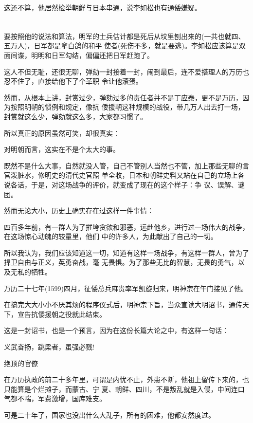 \documentclass[11pt,a4paper,onecolumn]{article}
\begin{document}
这还不算，他居然检举朝鲜与日本串通，说李如松也有通倭嫌疑。

\section[\thesection]{}

要按照他的说法和算法，明军的士兵估计都是死后从坟里刨出来的(一共也就四、五万人)，日军都是拿白鸽的和平
使者(死伤不多，就是要逃)。李如松应该算是双面间谍，明明和日军勾结，偏偏还把日军赶跑了。

这人不但无耻，还很无聊，弹劾一封接着一封，闹到最后，连不爱搭理人的万历也忍不住了，直接给他下了个革职
令让他滚蛋。

然而，从根本上讲，封赏过少，弹劾过多的责任者并不是丁应泰，更不是万历，因为按照明朝的惯例和规定，像抗
倭援朝这种规模的战役，带几万人出去打一场，封赏就这么少，弹劾就这么多，大家都习惯了。

所以真正的原因虽然可笑，却很真实：

对明朝而言，这实在不是个太大的事。

既然不是什么大事，自然就没人管，自己不管别人当然也不管，加上那些无聊的言官泼脏水，修明史的清代史官照
单全收，日本和朝鲜史料又站在自己的立场上各说各话，于是，对这场战争的评价，就变成了现在的这个样子：争
议、误解、谜团。

然而无论大小，历史上确实存在过这样一件事情：

四百多年前，有一群人为了摧垮贪欲和邪恶，远赴他乡，进行过一场伟大的战争，在这场惊心动魄的较量里，他们
中的许多人，为此献出了自己的一切。

所以我认为，我们应该知道这一切，知道有这样一场战争，有这样一群人，曾为了捍卫自由与正义，英勇奋战，毫
无畏惧。为了那些无比的智慧，无畏的勇气，以及无私的牺牲。

万历二十七年(1599)四月，征倭总兵麻贵率军凯旋归来，明神宗在午门接见了他。

在搞完大大小小不厌其烦的程序仪式后，明神宗下旨，当众宣读大明诏书，通传天下，宣告抗倭援朝之役就此结束。

这是一封诏书，也是一个预言，因为在这份长篇大论之中，有这样一句话：

义武奋扬，跳梁者，虽强必戮!

绝顶的官僚

在万历执政的前二十多年里，可谓是内忧不止，外患不断，他祖上留传下来的，也只能算是个烂摊子，而蒙古、宁
夏、朝鲜、四川，不是叛乱就是入侵，中间连口气都不喘，军费激增，国库难支。

可是二十年了，国家也没出什么大乱子，所有的困难，他都安然度过。
\end{document}
